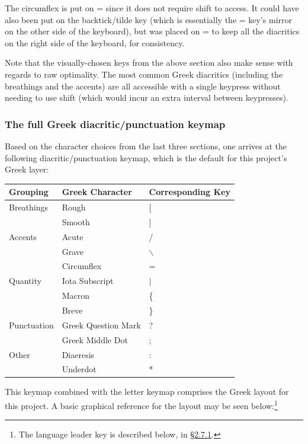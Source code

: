 \documentclass[11pt]{article}
\begin{document}
The circumflex is put on = since it does not require shift to access. It could have also been put on the backtick/tilde key (which is essentially the = key's mirror on the other side of the keyboard), but was placed on = to keep all the diacritics on the right side of the keyboard, for consistency.

Note that the visually-chosen keys from the above section also make sense with regards to raw optimality. The most common Greek diacritics (including the breathings and the accents) are all accessible with a single keypress without needing to use shift (which would incur an extra interval between keypresses).

\subsubsection{The full Greek diacritic/punctuation keymap}
\label{sec:org7973a50}

Based on the character choices from the last three sections, one arrives at the following diacritic/punctuation keymap, which is the default for this project's Greek layer:

\begin{center}
\begin{tabular}{lll}
Grouping & Greek Character & Corresponding Key\\
\hline
Breathings & Rough & [\\
 & Smooth & ]\\
Accents & Acute & /\\
 & Grave & $\backslash$\\
 & Circumflex & =\\
Quantity & Iota Subscript & \(\vert{}\)\\
 & Macron & \{\\
 & Breve & \}\\
Punctuation & Greek Question Mark & ?\\
 & Greek Middle Dot & ;\\
Other & Diaeresis & :\\
 & Underdot & *\\
\end{tabular}
\end{center}

This keymap combined with the letter keymap comprises the Greek layout for this project. A basic graphical reference for the layout may be seen below:\footnote{The language leader key is described below, in \hyperref[sec:org3588e31]{§2.7.1}.}
\end{document}
